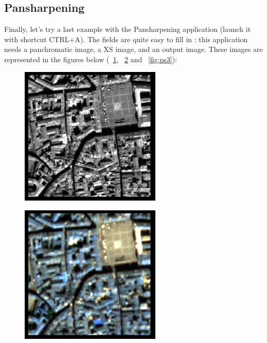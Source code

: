 \subsection{Pansharpening}\label{ssec:monpansh}
Finally, let's try a last example with the Pansharpening application (launch it with shortcut CTRL+A).
The fields are quite easy to fill in : this application needs a panchromatic image, a XS image, and an output image.
These images are represented in the figures below (~\ref{fig:ps1}, ~\ref{fig:ps2} and ~\ref{fig:ps3}):

\begin{figure}[!h] 
  \center
  \includegraphics[width=0.6\textwidth]{../Art/MonteverdiImages/ps1.png}
  \label{fig:ps1}
\end{figure}

\begin{figure}[!h] 
  \center
  \includegraphics[width=0.6\textwidth]{../Art/MonteverdiImages/ps2.png}
  \label{fig:ps2}
\end{figure}

